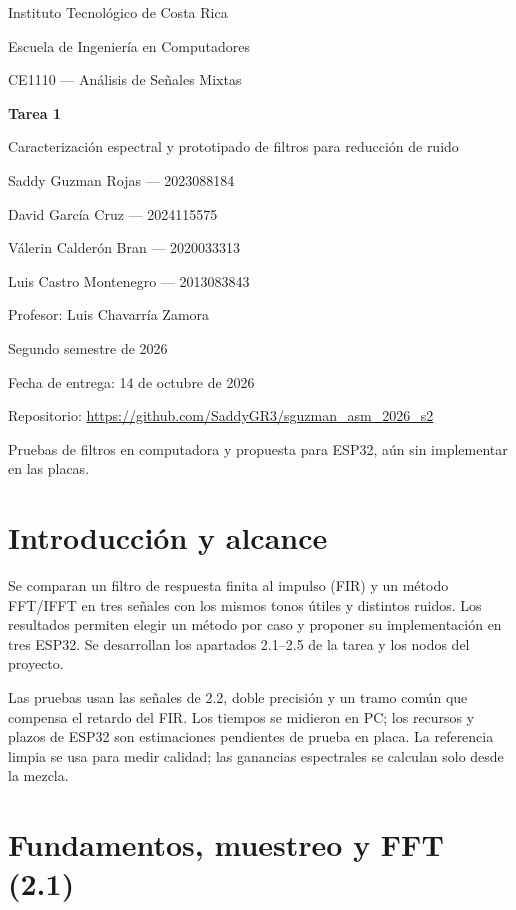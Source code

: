 \documentclass[11pt,a4paper]{article}
\newcommand{\integranteuno}{Saddy Guzman Rojas --- 2023088184}
\newcommand{\integrantedos}{David García Cruz --- 2024115575}
\newcommand{\integrantetres}{Válerin Calderón Bran --- 2020033313}
\newcommand{\integrantecuatro}{Luis Castro Montenegro --- 2013083843}
\begin{document}
\begin{titlepage}
\centering
{\Large Instituto Tecnológico de Costa Rica\par}
Escuela de Ingeniería en Computadores\par
CE1110 --- Análisis de Señales Mixtas\par
\vspace{2cm}
{\huge\bfseries Tarea 1\par}
\vspace{.5cm}
{\LARGE Caracterización espectral y prototipado de filtros para reducción de ruido\par}
\vspace{1.5cm}
\integranteuno\par\integrantedos\par\integrantetres\par\integrantecuatro\par
\vfill
Profesor: Luis Chavarría Zamora\par
Segundo semestre de 2026\par
Fecha de entrega: 14 de octubre de 2026\par
\vspace{.6cm}
\small Repositorio: \url{https://github.com/SaddyGR3/sguzman_asm_2026_s2}\par
Pruebas de filtros en computadora y propuesta para ESP32, aún sin implementar en las placas.
\end{titlepage}
\tableofcontents
\clearpage
\section{Introducción y alcance}
Se comparan un filtro de respuesta finita al impulso (FIR) y un método FFT/IFFT en tres señales con los mismos tonos útiles y distintos ruidos. Los resultados permiten elegir un método por caso y proponer su implementación en tres ESP32. Se desarrollan los apartados 2.1--2.5 de la tarea\cite{tarea} y los nodos del proyecto\cite{proyecto}.

Las pruebas usan las señales de 2.2, doble precisión y un tramo común que compensa el retardo del FIR. Los tiempos se midieron en PC; los recursos y plazos de ESP32 son estimaciones pendientes de prueba en placa. La referencia limpia se usa para medir calidad; las ganancias espectrales se calculan solo desde la mezcla.

\section{Fundamentos, muestreo y FFT (2.1)}
\end{document}
